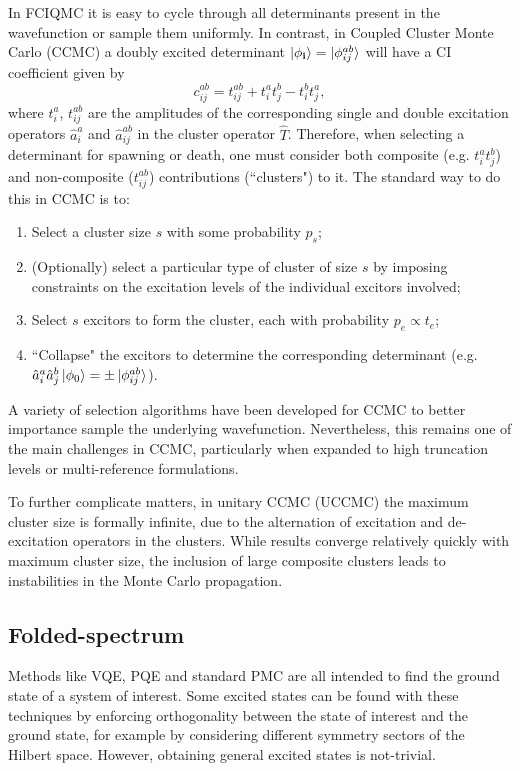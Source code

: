 \documentclass[%
 reprint,
 amsmath,amssymb,
 aps,
]{revtex4-2}
\begin{document}
In FCIQMC it is easy to cycle through all determinants present in the wavefunction or sample them uniformly. In contrast, in Coupled Cluster Monte Carlo (CCMC) a doubly excited determinant $\ket{\phi_\mathbf{i}} = \ket{\phi_{ij}^{ab}}$ will have a CI coefficient given by
\begin{equation}
    c_{ij}^{ab} = t_{ij}^{ab} + t_{i}^at_j^b - t_i^bt_j^a,
\end{equation}
where $t_{i}^a$, $t_{ij}^{ab}$ are the amplitudes of the corresponding single and double excitation operators $\hat a_i^a$ and $\hat a_{ij}^{ab}$ in the cluster operator $\hat T$. Therefore, when selecting a determinant for spawning or death, one must consider both composite (e.g. $t_{i}^at_j^b$) and non-composite ($t_{ij}^{ab}$) contributions (``clusters") to it. The standard way to do this in CCMC\cite{Thom2010, Scott2017} is to:
\begin{enumerate}
    \item Select a cluster size $s$ with some probability $p_s$;
    \item (Optionally) select a particular type of cluster of size $s$ by imposing constraints on the excitation levels of the individual excitors involved;\cite{Scott2017}
    \item Select $s$ excitors to form the cluster, each with probability $p_e \propto t_e$;
    \item ``Collapse" the excitors to determine the corresponding determinant (e.g. $\hat a_i^a \hat a_j^b \ket{\phi_0} = \pm\ket{\phi_{ij}^{ab}}$).
\end{enumerate}

A variety of selection algorithms have been developed for CCMC  to better importance sample the underlying wavefunction.\cite{Scott2017} Nevertheless, this remains one of the main challenges in CCMC, particularly when expanded to high truncation levels\cite{Neufeld2017} or multi-reference formulations.\cite{Filip2019} 

To further complicate matters, in unitary CCMC (UCCMC)\cite{Filip2020} the maximum cluster size is formally infinite, due to the alternation of excitation and de-excitation operators in the clusters. While results converge relatively quickly with maximum cluster size, the inclusion of large composite clusters leads to instabilities in the Monte Carlo propagation.


\subsection{Folded-spectrum} 
Methods like VQE, PQE and standard PMC are all intended to find the ground state of a system of interest. Some excited states can be found with these techniques by enforcing orthogonality between the state of interest and the ground state, for example by considering different symmetry sectors of the Hilbert space.\cite{Nakanishi2019} However, obtaining general excited states is not-trivial.
\end{document}
